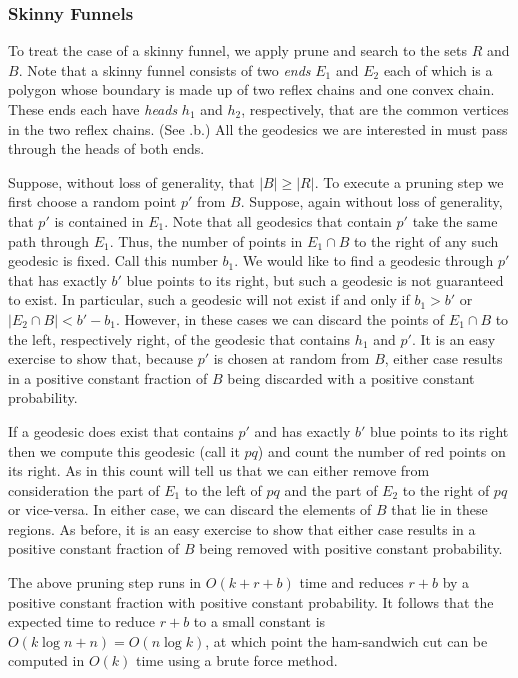 \documentclass[charterfonts,lotsofwhite]{patmorin}
\begin{document}
\subsubsection{Skinny Funnels}

To treat the case of a skinny funnel, we apply prune and search to the
sets $R$ and $B$.  Note that a skinny funnel consists of two
\emph{ends} $E_1$ and $E_2$ each of which is a polygon whose boundary
is made up of two reflex chains and one convex chain.  These ends each
have \emph{heads} $h_1$ and $h_2$, respectively, that are the common
vertices in the two reflex chains.  (See .b.)
All the geodesics we are interested in must pass through the heads of
both ends. 

Suppose, without loss of generality, that $|B|\ge |R|$.  To execute a
pruning step we first choose a random point $p'$ from $B$. Suppose,
again without loss of generality, that $p'$ is contained in $E_1$.
Note that all geodesics that contain $p'$ take the same path through
$E_1$.  Thus, the number of points in $E_1\cap B$ to the right of any
such geodesic is fixed. Call this number $b_1$.  We would like to find
a geodesic through $p'$ that has exactly $b'$ blue points to its right, but
such a geodesic is not guaranteed to exist.  In particular, such a
geodesic will not exist if and only if $b_1 > b'$ or $|E_2\cap B| <
b'-b_1$.  However, in these cases we can discard the points of
$E_1\cap B$ to the left, respectively right, of the geodesic that
contains $h_1$ and $p'$.  It is an easy exercise to show that, because
$p'$ is chosen at random from $B$, either case results in a positive
constant fraction of $B$ being discarded with a positive constant
probability.

If a geodesic does exist that contains $p'$ and has exactly $b'$ blue
points to its right then we compute this geodesic (call it $pq$) and
count the number of red points on its right.  As in
 this count will tell us that we can
either remove from consideration the part of $E_1$ to the left of $pq$
and the part of $E_2$ to the right of $pq$ or vice-versa.  In either
case, we can discard the elements of $B$ that lie in these regions.
As before, it is an easy exercise to show that either case results in
a positive constant fraction of $B$ being removed with positive
constant probability.

The above pruning step runs in $O(k+r+b)$ time and reduces $r+b$ by a
positive constant fraction with positive constant probability.  It
follows that the expected time to reduce $r+b$ to a small constant is
$O(k\log n + n) = O(n\log k)$, at which point the ham-sandwich cut can
be computed in $O(k)$ time using a brute force method.
\end{document}
